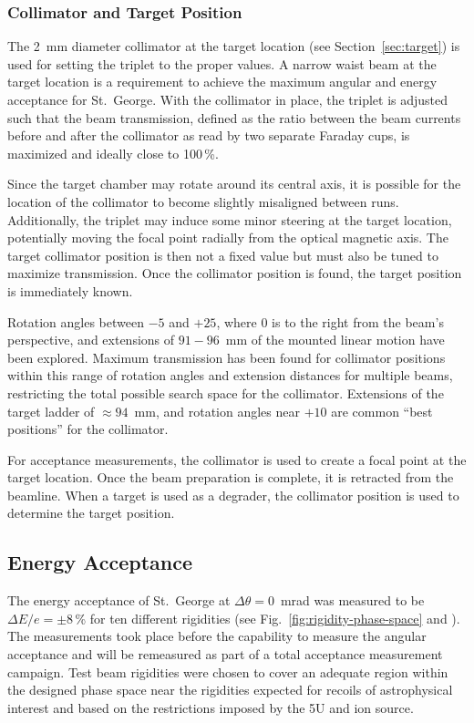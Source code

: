 \subsubsection{Collimator and Target Position}

The 2~mm diameter collimator at the target location (see
Section~\ref{sec:target}) is used for setting the triplet to the proper
values. A narrow waist beam at the target location is a requirement to
achieve the maximum angular and energy acceptance for St.\ George. With
the collimator in place, the triplet is adjusted such that the beam
transmission, defined as the ratio between the beam currents before and
after the collimator as read by two separate Faraday cups, is maximized
and ideally close to 100\,\%.

Since the target chamber may rotate around its central axis, it is
possible for the location of the collimator to become slightly
misaligned between runs. Additionally, the triplet may induce some minor
steering at the target location, potentially moving the focal point
radially from the optical magnetic axis. The target collimator position
is then not a fixed value but must also be tuned to maximize
transmission. Once the collimator position is found, the target position
is immediately known.

Rotation angles between $-5$ and $+25$\degree{}, where 0\degree{} is to
the right from the beam's perspective, and extensions of $91-96$~mm of
the mounted linear motion have been explored. Maximum transmission has
been found for collimator positions within this range of rotation angles
and extension distances for multiple beams, restricting the total
possible search space for the collimator. Extensions of the target
ladder of $\approx 94$~mm, and rotation angles near $+10$\degree{} are
common ``best positions'' for the collimator.

For acceptance measurements, the collimator is used to create a focal
point at the target location. Once the beam preparation is complete, it
is retracted from the beamline. When a target is used as a degrader, the
collimator position is used to determine the target position.


\subsection{Energy Acceptance}

The energy acceptance of St.\ George at $\Delta\theta = 0$~mrad was
measured to be $\Delta E/e = \pm 8$\,\% for ten different rigidities
(see Fig.~\ref{fig:rigidity-phase-space} and \cite{Meisel2017}). The
measurements took place before the capability to measure the angular
acceptance and will be remeasured as part of a total acceptance
measurement campaign. Test beam rigidities were chosen to cover an
adequate region within the designed phase space near the rigidities
expected for recoils of astrophysical interest and based on the
restrictions imposed by the 5U and ion source.

